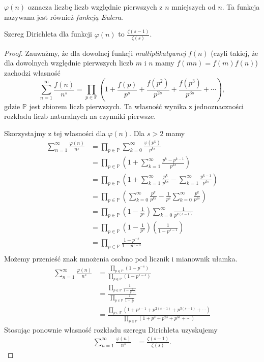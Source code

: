 \documentclass[shortabstract]{imthesis}
\begin{document}
\begin{definition}
    $\varphi(n)$ oznacza liczbę liczb względnie pierwszych z $n$ mniejszych od $n$. Ta funkcja nazywana jest również \emph{funkcją Eulera}.
\end{definition}
\begin{remark}
    Szereg Dirichleta dla funkcji $\varphi(n)$ to $\frac{\zeta(s-1)}{\zeta(s)}$.
\end{remark}
\begin{proof}
Zauważmy, że dla dowolnej funkcji \emph{multiplikatywnej} $f(n)$ (czyli takiej, że dla dowolnych względnie pierwszych liczb $m$ i $n$ mamy $f(mn) = f(m)f(n)$) zachodzi własność
$$
\sum_{n=1}^\infty \frac{f(n)}{n^s} = \prod_{p \in \mathbb{P}} \left(1 + \frac{f(p)}{p^s} + \frac{f(p^2)}{p^{2s}} + \frac{f(p^3)}{p^{3s}} + \cdots \right),
$$
gdzie $\mathbb{P}$ jest zbiorem liczb pierwszych. Ta własność wynika z jednoznaczności rozkładu liczb naturalnych na czynniki pierwsze. 

Skorzystajmy z tej własności dla $\varphi(n)$. Dla $s > 2$ mamy
\begin{align*}
\sum_{n=1}^\infty \frac{\varphi(n)}{n^s} &= \prod_{p \in \mathbb{P}} \sum_{k=0}^\infty \frac{\varphi(p^k)}{p^{ks}} \\
&= \prod_{p \in \mathbb{P}} \left(1 + \sum_{k=1}^\infty \frac{p^k - p^{k-1}}{p^{ks}} \right) \\
&= \prod_{p \in \mathbb{P}} \left(1 + \sum_{k=1}^\infty \frac{p^k}{p^{ks}} - \sum_{k=1}^\infty \frac{p^{k-1}}{p^{ks}} \right) \\
&= \prod_{p \in \mathbb{P}} \left(\sum_{k=0}^\infty \frac{p^k}{p^{ks}} - \frac{1}{p^s} \sum_{k=0}^\infty \frac{p^k}{p^{ks}} \right) \\
&= \prod_{p \in \mathbb{P}} \left(1 - \frac{1}{p^s}\right) \sum_{k=0}^\infty \frac{1}{p^{k(s-1)}} \\
&= \prod_{p \in \mathbb{P}} \left(1 - \frac{1}{p^s}\right) \left(\frac{1}{1-p^{s-1}}\right) \\
&= \prod_{p \in \mathbb{P}} \frac{1-p^{-s}}{1-p^{1-s}} \\
\end{align*}
Możemy przenieść znak mnożenia osobno pod licznik i mianownik ułamka.
\begin{align*}
\sum_{n=1}^\infty \frac{\varphi(n)}{n^s} &= \frac{\prod_{p \in \mathbb{P}} (1-p^{-s})}{\prod_{p \in \mathbb{P}}(1-p^{1-s})} \\
&= \frac{\prod_{p \in \mathbb{P}} \frac{1}{1-\frac{1}{p^{s-1}}}}{\prod_{p \in \mathbb{P}} \frac{1}{1-\frac{1}{p^s}}} \\
&= \frac{\prod_{p \in \mathbb{P}} \left(1+p^{s-1}+p^{2(s-1)}+p^{3(s-1)}+\cdots\right)}{\prod_{p \in \mathbb{P}} \left(1+p^s+p^{2s}+p^{3s}+\cdots\right)}
\end{align*}
Stosując ponownie własność rozkładu szeregu Dirichleta uzyskujemy
\begin{align*}
\sum_{n=1}^\infty \frac{\varphi(n)}{n^s} &= \frac{\zeta(s-1)}{\zeta(s)}.
\end{align*}
\end{proof}
\end{document}
